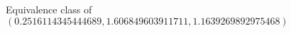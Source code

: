 \documentclass[preview]{standalone}
\begin{document}
\begin{center}
Equivalence class of $(0.2516114345444689, 1.606849603911711, 1.1639269892975468)$
\end{center}
\end{document}
